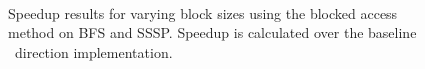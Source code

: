 \begin{figure}[!ht]
    \centering
     \\
    \caption{Speedup results for varying block sizes using the blocked access method on BFS and SSSP. Speedup is calculated over the baseline \pull~direction implementation.}
    \label{pap:generals:sec:eval:fig:block}
\end{figure}
 
